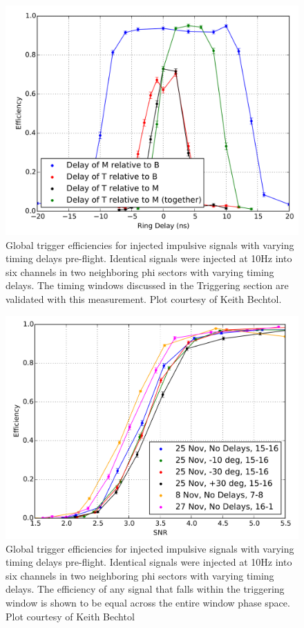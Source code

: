 \begin{figure}
	\centering
	\includegraphics[width=\textwidth]{figures/ringDelayEfficiency}
	\caption{Global trigger efficiencies for injected impulsive signals with varying timing delays pre-flight.  Identical signals were injected at 10Hz into six channels in two neighboring phi sectors with varying timing delays.  The timing windows discussed in the Triggering section are validated with this measurement.  Plot courtesy of Keith Bechtol.}
	\label{fig:delayEfficiency}
\end{figure}

\begin{figure}
	\centering
	\includegraphics[width=\textwidth]{figures/elevationCalibrationEfficiency}
	\caption{Global trigger efficiencies for injected impulsive signals with varying timing delays pre-flight.  Identical signals were injected at 10Hz into six channels in two neighboring phi sectors with varying timing delays.  The efficiency of any signal that falls within the triggering window is shown to be equal across the entire window phase space.  Plot courtesy of Keith Bechtol}
	\label{fig:elevationEfficiency}
\end{figure}
		
